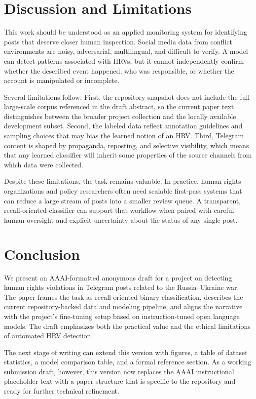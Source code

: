 \documentclass[letterpaper]{article}
\begin{document}
\section{Discussion and Limitations}
This work should be understood as an applied monitoring system for identifying posts that deserve closer human inspection. Social media data from conflict environments are noisy, adversarial, multilingual, and difficult to verify. A model can detect patterns associated with HRVs, but it cannot independently confirm whether the described event happened, who was responsible, or whether the account is manipulated or incomplete.

Several limitations follow. First, the repository snapshot does not include the full large-scale corpus referenced in the draft abstract, so the current paper text distinguishes between the broader project collection and the locally available development subset. Second, the labeled data reflect annotation guidelines and sampling choices that may bias the learned notion of an HRV. Third, Telegram content is shaped by propaganda, reposting, and selective visibility, which means that any learned classifier will inherit some properties of the source channels from which data were collected.

Despite these limitations, the task remains valuable. In practice, human rights organizations and policy researchers often need scalable first-pass systems that can reduce a large stream of posts into a smaller review queue. A transparent, recall-oriented classifier can support that workflow when paired with careful human oversight and explicit uncertainty about the status of any single post.

\section{Conclusion}
We present an AAAI-formatted anonymous draft for a project on detecting human rights violations in Telegram posts related to the Russia--Ukraine war. The paper frames the task as recall-oriented binary classification, describes the current repository-backed data and modeling pipeline, and aligns the narrative with the project's fine-tuning setup based on instruction-tuned open language models. The draft emphasizes both the practical value and the ethical limitations of automated HRV detection.

The next stage of writing can extend this version with figures, a table of dataset statistics, a model comparison table, and a formal reference section. As a working submission draft, however, this version now replaces the AAAI instructional placeholder text with a paper structure that is specific to the repository and ready for further technical refinement.
\end{document}
